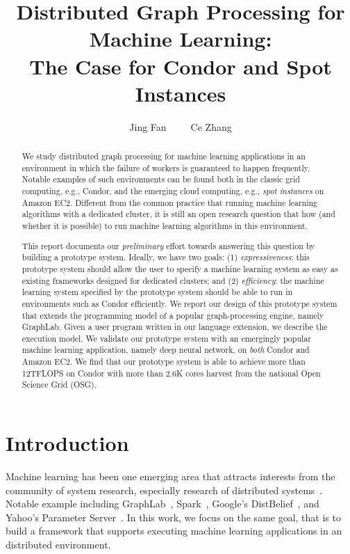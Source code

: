 \documentclass[11pt]{article}
\title{Distributed Graph Processing for Machine Learning:\\
The Case for Condor and Spot Instances}
\author{Jing Fan~~~~~Ce Zhang}
\date{}
\begin{document}
\maketitle

\begin{abstract}
We study distributed graph processing for machine learning
applications in an environment
in which the failure of workers is guaranteed to happen
frequently. Notable examples of such environments can be found
both in the classic grid computing, e.g., Condor, and the emerging
cloud computing, e.g., {\em spot instances} on Amazon EC2.
Different from the common practice that running
machine learning algorithms with a dedicated cluster,
it is still an open research question that how (and whether
it is possible) to run machine learning algorithms in
this environment.

This report documents our {\em preliminary} effort towards 
answering this question by building a prototype system. 
Ideally, we have two goals: (1) {\em expressiveness}:
this prototype system should allow the user to specify
a machine learning system as easy as existing frameworks
designed for dedicated clusters; and (2) {\em efficiency}:
the machine learning system specified by the prototype system
should be able to run in environments such as Condor efficiently.
We report our design of this prototype system that extends
the programming model of a popular graph-processing engine,
namely GraphLab. Given a user program written in our language
extension, we describe the execution model. We validate
our prototype system with an emergingly popular machine
learning application, namely deep neural network, on {\em both}
Condor and Amazon EC2. We find that our prototype system is
able to achieve more than 12TFLOPS on Condor with more than
2.6K cores harvest from the national Open Science Grid (OSG).

\end{abstract}

\section{Introduction}

Machine learning has been one emerging area that
attracts interests from the community of system 
research, especially research of 
distributed systems~\cite{Li:2014:OSDI,GraphLab:OSDI}. 
Notable example including GraphLab~\cite{GraphLab:OSDI},
Spark~\cite{Spark}, Google's DistBelief~\cite{Google}, and 
Yahoo's Parameter Server~\cite{Yahoo,Li:2014:OSDI}. 
In this work, we focus on the same goal, that is 
to build a framework that supports executing machine 
learning applications in an distributed environment.
\end{document}
